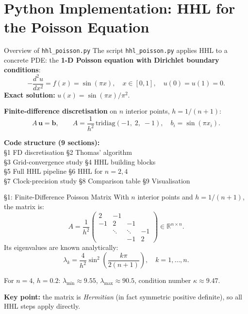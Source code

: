 \documentclass{beamer}
\begin{document}
\section{Python Implementation: HHL for the Poisson Equation}

\begin{frame}{Overview of \texttt{hhl\_poisson.py}}
The script \texttt{hhl\_poisson.py} applies HHL to a concrete PDE:
the \textbf{1-D Poisson equation with Dirichlet boundary conditions}:
\[
  -\frac{d^2 u}{dx^2} = f(x) = \sin(\pi x),
  \quad x\in[0,1],
  \quad u(0)=u(1)=0.
\]
\textbf{Exact solution:} $u(x) = \sin(\pi x)/\pi^2$.

\medskip
\textbf{Finite-difference discretisation} on $n$ interior points,
$h=1/(n+1)$:
\[
  A\,\mathbf{u} = \mathbf{b},
  \qquad
  A = \frac{1}{h^2}\,\mathrm{tridiag}(-1,\;2,\;-1),
  \quad
  b_i = \sin(\pi x_i).
\]

\medskip
\textbf{Code structure (9 sections):}\\
\S1 FD discretisation \quad \S2 Thomas' algorithm\\
\S3 Grid-convergence study \quad \S4 HHL building blocks\\
\S5 Full HHL pipeline \quad \S6 HHL for $n=2,4$\\
\S7 Clock-precision study \quad \S8 Comparison table \quad \S9 Visualisation
\end{frame}


\begin{frame}{\S1: Finite-Difference Poisson Matrix}
With $n$ interior points and $h=1/(n+1)$, the matrix is:
\[
  A = \frac{1}{h^2}
  \begin{pmatrix}
    2  & -1 &    &    \\
    -1 &  2 & -1 &    \\
       & \ddots & \ddots & -1 \\
       &    & -1 &  2
  \end{pmatrix}
  \in \mathbb{R}^{n\times n}.
\]
Its eigenvalues are known analytically:
\[
  \lambda_k = \frac{4}{h^2}\sin^2\!\left(\frac{k\pi}{2(n+1)}\right),
  \quad k = 1,\ldots,n.
\]

For $n=4$, $h=0.2$:
$\lambda_{\min} \approx 9.55$, $\lambda_{\max} \approx 90.5$,
condition number $\kappa \approx 9.47$.

\medskip
\textbf{Key point:} the matrix is \emph{Hermitian} (in fact symmetric
positive definite), so all HHL steps apply directly.
\end{frame}
\end{document}
